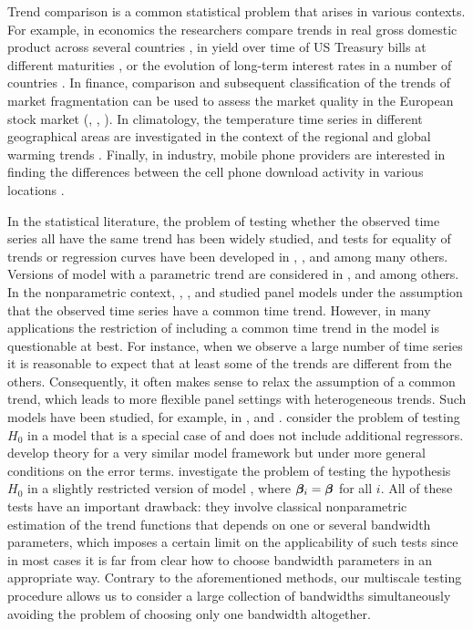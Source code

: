 \documentclass[a4paper,12pt]{article}
\makeatletter
\renewcommand{\eqref}[1]{\tagform@{\ref{#1}}}
\makeatother
\begin{document}
Trend comparison is a common statistical problem that arises in various contexts. For example, in economics the researchers compare trends in real gross domestic product across several countries \citep[][]{Grier1989}, in yield over time of US Treasury bills at different maturities \citep[][]{Park2009}, or the evolution of long-term interest rates in a number of countries \citep[][]{Christiansen1997}. In finance, comparison and subsequent classification of the trends of market fragmentation can be used to assess the market quality in the European stock market (\citeauthor{VogtLinton2017}, \citeyear{VogtLinton2017}, \citeyear{VogtLinton2020}). In climatology, the temperature time series in different geographical areas are investigated in the context of the regional and global warming trends \citep[][]{KarolyWu2005}. Finally, in industry, mobile phone providers are interested in finding the differences between the cell phone download activity in various locations \citep[][]{DegrasWu2012}.


In the statistical literature, the problem of testing whether the observed time series all have the same trend  has been widely studied, and tests for equality of trends or regression curves have been developed in \cite{HaerdleMarron1990}, \cite{Hall1990}, \linebreak \cite{Delgado1993} and \cite{DegrasWu2012} among many others. Versions of model \eqref{eq:model} with a parametric trend are considered in \cite{Vogelsang2005}, \cite{Sun2011} and \cite{Xu2012} among others. In the nonparametric context, \cite{LiChenGao2010}, \cite{Atak2011}, \cite{Robinson2012} and \cite{ChenGaoLi2012} studied panel models under the assumption that the observed time series have a common time trend. However, in many applications the restriction of including a common time trend in the model is questionable at best. For instance, when we observe a large number of time series it is reasonable to expect that at least some of the trends are different from the others. Consequently, it often makes sense to relax the assumption of a common trend, which leads to more flexible panel settings with heterogeneous trends. Such models have been studied, for example, in \cite{DegrasWu2012},  \cite{Zhang2012} and \cite{Hidalgo2014}. \cite{DegrasWu2012} consider the problem of testing $H_0$ in a model that is a special case of \eqref{eq:model} and does not include additional regressors. \cite{ChenWu2018} develop theory for a very similar model framework but under more general conditions on the error terms. \linebreak \cite{Zhang2012} investigate the problem of testing the hypothesis $H_0$ in a slightly restricted version of model \eqref{eq:model}, where $\bm{\beta}_i = \bm{\beta}$ for all $i$. All of these tests have an important drawback: they involve classical nonparametric estimation of the trend functions that depends on one or several bandwidth parameters, which imposes a certain limit on the applicability of such tests since in most cases it is far from clear how to choose bandwidth parameters in an appropriate way. Contrary to the aforementioned methods, our multiscale testing procedure allows us to consider a large collection of bandwidths simultaneously avoiding the problem of choosing only one bandwidth altogether.
\end{document}
